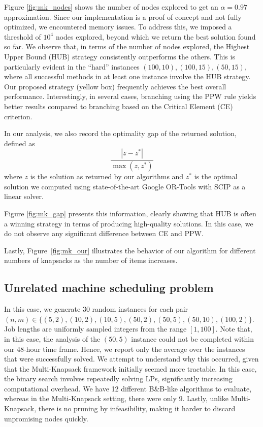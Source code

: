 \documentclass[moor,sglanonrev]{informs4}
\theoremstyle{plain}
\begin{document}
Figure \ref{fig:mk_nodes} shows the number of nodes explored to get an $\alpha = 0.97$ approximation. %
%
Since our implementation is a proof of concept and not fully optimized, we encountered memory issues. To address this, we imposed a threshold of $10^4$ nodes explored, beyond which we return the best solution found so far.
%
We observe that, in terms of the number of nodes explored, the Highest Upper Bound (HUB) strategy consistently outperforms the others. 
This is particularly evident in the ``hard'' instances $(100, 10), (100, 15), (50, 15)$, where all successful methods in at least one instance involve the HUB strategy.
%
Our proposed strategy (yellow box) frequently achieves the best overall performance.
%
Interestingly, in several cases, branching using the PPW rule yields better results compared to branching based on the Critical Element (CE) criterion.

In our analysis, we also record the optimality gap of the returned solution, defined as 
\[\frac{|z - z^*|}{\max(z,z^*)} \]
where $z$ is the solution as returned by our algorithms and $z^*$ is the optimal solution we computed using state-of-the-art Google OR-Tools \cite{ortools} with SCIP \cite{scip} as a linear solver. 
%

Figure \ref{fig:mk_gap} presents this information, clearly showing that HUB is often a winning strategy in terms of producing high-quality solutions. In this case, we do not observe any significant difference between CE and PPW.
%

Lastly, Figure~\ref{fig:mk_our} illustrates the behavior of our algorithm for different numbers of knapsacks as the number of items increases.



\subsection{Unrelated machine scheduling problem}
In this case, we generate 30 random instances for each pair $(n, m) \in \{(5, 2), (10, 2), (10, 5), (50, 2), (50, 5), (50, 10), (100, 2)\}$. Job lengths are uniformly sampled integers from the range $[1, 100]$. 
%
Note that, in this case, the analysis of the $(50, 5)$ instance could not be completed within our 48-hour time frame. Hence, we report only the average over the instances that were successfully solved.  
%
We attempt to understand why this occurred, given that the Multi-Knapsack framework initially seemed more tractable.  
%
In this case, the binary search involves repeatedly solving LPs, significantly increasing computational overhead. We have 12 different B\&B-like algorithms to evaluate, whereas in the Multi-Knapsack setting, there were only 9. Lastly, unlike Multi-Knapsack, there is no pruning by infeasibility, making it harder to discard unpromising nodes quickly.
\end{document}
